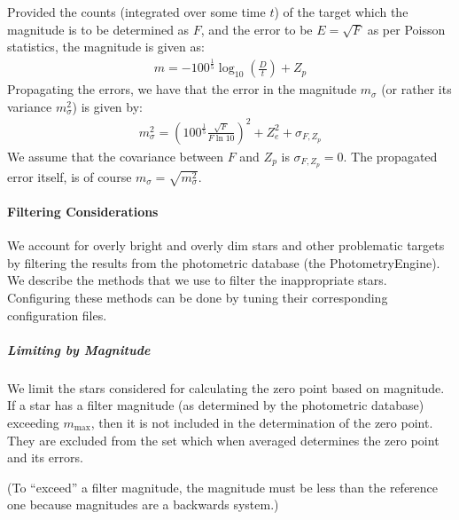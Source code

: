 \documentclass[letterpaper,11pt,english]{sphinxmanual}
\begin{document}
\sphinxAtStartPar
Provided the counts (integrated over some time \(t\)) of the target which the magnitude is to be determined as \(F\), and the error to be
\(E = \sqrt{F}\) as per Poisson statistics, the magnitude is given as:
\begin{equation*}
\begin{split}m = - 100^\frac{1}{5} \log_{10} \left( \frac{D}{t} \right) + Z_p\end{split}
\end{equation*}
\sphinxAtStartPar
Propagating the errors, we have that the error in the magnitude \(m_\sigma\)
(or rather its variance \(m_\sigma^2\)) is given by:
\begin{equation*}
\begin{split}m_\sigma^2 = \left( 100^\frac{1}{5} \frac{\sqrt{F}}{F \ln 10} \right)^2 + Z_e^2 + \sigma_{F,Z_p}\end{split}
\end{equation*}
\sphinxAtStartPar
We assume that the covariance between \(F\) and \(Z_p\) is
\(\sigma_{F,Z_p} = 0\). The propagated error itself, is of course
\(m_\sigma = \sqrt{m_\sigma^2}\).


\paragraph{Filtering Considerations}
\label{\detokenize{technical/algorithms/photometric_zero_point:filtering-considerations}}
\sphinxAtStartPar
We account for overly bright and overly dim stars and other problematic
targets by filtering the results from the photometric database
(the PhotometryEngine). We describe the methods that we use to filter the
inappropriate stars. Configuring these methods can be done by tuning their
corresponding configuration files.


\subparagraph{Limiting by Magnitude}
\label{\detokenize{technical/algorithms/photometric_zero_point:limiting-by-magnitude}}
\sphinxAtStartPar
We limit the stars considered for calculating the zero point based on
magnitude. If a star has a filter magnitude (as determined by the
photometric database) exceeding \(m_\text{max}\), then it is not included
in the determination of the zero point. They are excluded from the set which
when averaged determines the zero point and its errors.

\sphinxAtStartPar
(To “exceed” a filter magnitude, the magnitude must be less than the reference
one because magnitudes are a backwards system.)

\sphinxstepscope
\end{document}
